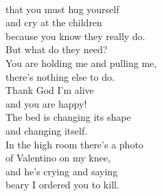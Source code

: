 \documentclass[smalldemyvopaper,11pt,twoside,onecolumn,openright,extrafontsizes]{memoir}
\begin{document}
\\that you must hug yourself
\\and cry at the children
\\because you know they really do.
\\But what do they need?
\\You are holding me and pulling me,
\\there's nothing else to do.
\\Thank God I'm alive
\\and you are happy!
\\The bed is changing its shape
\\and changing itself.
\\In the high room there's a photo
\\of Valentino on my knee,
\\and he's crying and saying
\\beary I ordered you to kill.
\end{document}
